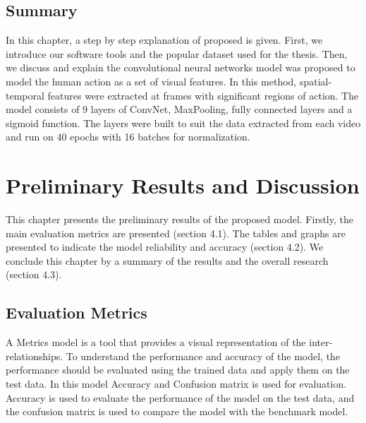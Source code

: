 \subsection{Summary}
\hspace{5mm} In this chapter, a step by step explanation of proposed is given. First, we introduce our software tools and the popular dataset used for the thesis. Then, we discuss and explain the convolutional neural networks model was proposed to model the human action as a set of visual features. In this method, spatial-temporal features were extracted at frames with significant regions of action. The model consists of 9 layers of ConvNet, MaxPooling, fully connected layers and a sigmoid function. The layers were built to suit the data extracted from each video and run on 40 epochs with 16 batches for normalization.
\section{Preliminary Results and Discussion}
This chapter presents the preliminary results of the proposed model. Firstly, the main evaluation metrics are presented (section 4.1). The tables and graphs are presented to indicate the model reliability and accuracy (section 4.2). We conclude this chapter by a summary of the results and the overall research (section 4.3).

\subsection{Evaluation Metrics}
\hspace{5mm} A Metrics model is a tool that provides a visual representation of the inter-relationships. To understand the performance and accuracy of the model, the performance should be evaluated using the trained data and apply them on the test data. In this model Accuracy and Confusion matrix is used for evaluation. Accuracy is used to evaluate the performance of the model on the test data, and the confusion matrix is used to compare the model with the benchmark model.
